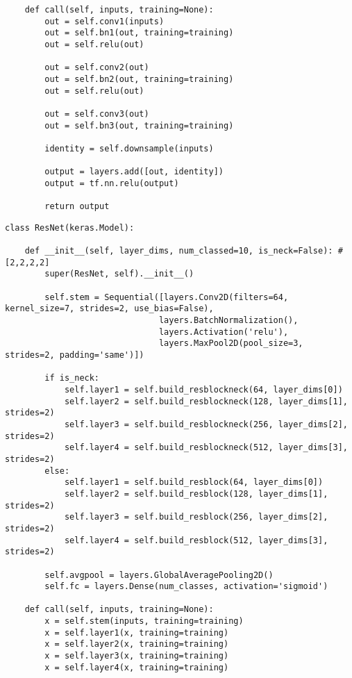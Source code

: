 \begin{verbatim}
    def call(self, inputs, training=None):
        out = self.conv1(inputs)
        out = self.bn1(out, training=training)
        out = self.relu(out)

        out = self.conv2(out)
        out = self.bn2(out, training=training)
        out = self.relu(out)

        out = self.conv3(out)
        out = self.bn3(out, training=training)

        identity = self.downsample(inputs)

        output = layers.add([out, identity])
        output = tf.nn.relu(output)

        return output
\end{verbatim}





\begin{verbatim}
class ResNet(keras.Model):

    def __init__(self, layer_dims, num_classed=10, is_neck=False): #[2,2,2,2]
        super(ResNet, self).__init__()

        self.stem = Sequential([layers.Conv2D(filters=64, kernel_size=7, strides=2, use_bias=False),
                               layers.BatchNormalization(),
                               layers.Activation('relu'),
                               layers.MaxPool2D(pool_size=3, strides=2, padding='same')])

        if is_neck:
            self.layer1 = self.build_resblockneck(64, layer_dims[0])
            self.layer2 = self.build_resblockneck(128, layer_dims[1], strides=2)
            self.layer3 = self.build_resblockneck(256, layer_dims[2], strides=2)
            self.layer4 = self.build_resblockneck(512, layer_dims[3], strides=2)
        else:
            self.layer1 = self.build_resblock(64, layer_dims[0])
            self.layer2 = self.build_resblock(128, layer_dims[1], strides=2)
            self.layer3 = self.build_resblock(256, layer_dims[2], strides=2)
            self.layer4 = self.build_resblock(512, layer_dims[3], strides=2)

        self.avgpool = layers.GlobalAveragePooling2D()
        self.fc = layers.Dense(num_classes, activation='sigmoid')

    def call(self, inputs, training=None):
        x = self.stem(inputs, training=training)
        x = self.layer1(x, training=training)
        x = self.layer2(x, training=training)
        x = self.layer3(x, training=training)
        x = self.layer4(x, training=training)


\end{verbatim}
